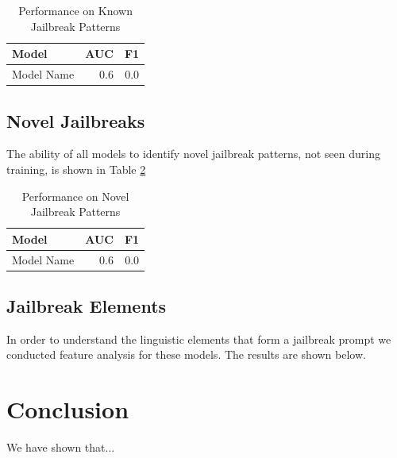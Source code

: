 \documentclass[12pt,a4paper]{article}
\begin{document}
\begin{table}
\caption{Performance on Known Jailbreak Patterns}
\label{results:known}
\begin{tabular}{l|r|r}
\toprule
Model             &AUC   &F1              \\
\midrule
Model Name        &0.6   &0.0              \\
\bottomrule
\end{tabular}
\end{table}


\subsection{Novel Jailbreaks}

The ability of all models to identify novel jailbreak patterns, not seen during training,
 is shown in Table \ref{results:novel}

\begin{table}
\caption{Performance on Novel Jailbreak Patterns}
\label{results:novel}
\begin{tabular}{l|r|r}
\toprule
Model             &AUC   &F1              \\
\midrule
Model Name        &0.6   &0.0              \\
\bottomrule
\end{tabular}
\end{table}



\subsection{Jailbreak Elements}

In order to understand the linguistic elements that form a jailbreak prompt we conducted
feature analysis for these models. The results are shown below.



\section{Conclusion}

We have shown that...



\end{document}
